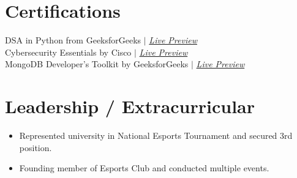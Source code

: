 \documentclass[letterpaper,11pt]{article}
\newcommand{\resumeItem}[1]{
  \item\small{
    {#1 \vspace{-2pt}}
  }
}
\newcommand{\resumeSubHeadingListStart}{\begin{itemize}[leftmargin=0.0in, label={}]}
\newcommand{\resumeSubHeadingListEnd}{\end{itemize}}
\newcommand{\resumeItemListStart}{\begin{itemize}}
\newcommand{\resumeItemListEnd}{\end{itemize}\vspace{-5pt}}
\begin{document}
%
\section{Certifications}
 \begin{itemize}[leftmargin=0.15in, label={}]
    \small{\item{
     DSA in Python from GeeksforGeeks $|$ \emph{\href{https://www.geeksforgeeks.org/certificate/3b0f13e03396f2d6eb175d2a0f0a7d3c}{Live Preview}} \\
     Cybersecurity Essentials by Cisco $|$ \emph{\href{https://www.linkedin.com/in/chiragbisht/details/certifications/1724493812434/single-media-viewer/?profileId=ACoAADkmcikB-Tw6lrnhytASCj9UZzOyYQKePfM}{Live Preview}}\\
     MongoDB Developer's Toolkit by GeeksforGeeks $|$ \emph{\href{https://www.geeksforgeeks.org/certificate/83da2679f0e0eacf29f89c20f4ff3a1e}{Live Preview}} }}
 \end{itemize}
 \vspace{-16pt}


\section{Leadership / Extracurricular}
    \resumeSubHeadingListStart
        
            \resumeItemListStart
                \resumeItem{Represented university in National Esports Tournament and secured 3rd position.}
                \resumeItem{Founding member of Esports Club and conducted multiple events.}
                
            \resumeItemListEnd
        
    \resumeSubHeadingListEnd
\end{document}
